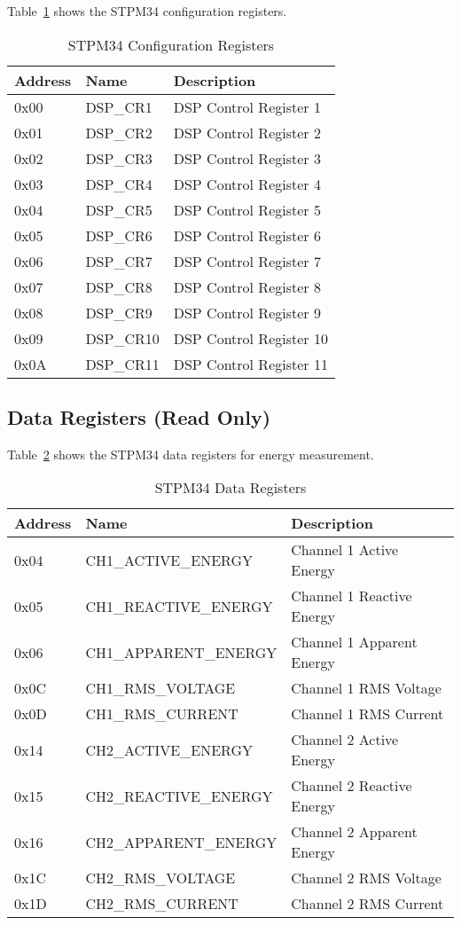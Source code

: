 \documentclass[11pt,a4paper]{article}
\begin{document}
Table~\ref{tab:config_regs} shows the STPM34 configuration registers.

\begin{table}[H]
\centering
\begin{tabular}{lll}
\toprule
\textbf{Address} & \textbf{Name} & \textbf{Description} \\
\midrule
0x00 & DSP\_CR1 & DSP Control Register 1 \\
0x01 & DSP\_CR2 & DSP Control Register 2 \\
0x02 & DSP\_CR3 & DSP Control Register 3 \\
0x03 & DSP\_CR4 & DSP Control Register 4 \\
0x04 & DSP\_CR5 & DSP Control Register 5 \\
0x05 & DSP\_CR6 & DSP Control Register 6 \\
0x06 & DSP\_CR7 & DSP Control Register 7 \\
0x07 & DSP\_CR8 & DSP Control Register 8 \\
0x08 & DSP\_CR9 & DSP Control Register 9 \\
0x09 & DSP\_CR10 & DSP Control Register 10 \\
0x0A & DSP\_CR11 & DSP Control Register 11 \\
\bottomrule
\end{tabular}
\caption{STPM34 Configuration Registers}
\label{tab:config_regs}
\end{table}

\subsection{Data Registers (Read Only)}

Table~\ref{tab:data_regs} shows the STPM34 data registers for energy measurement.

\begin{table}[H]
\centering
\small
\begin{tabular}{lll}
\toprule
\textbf{Address} & \textbf{Name} & \textbf{Description} \\
\midrule
0x04 & CH1\_ACTIVE\_ENERGY & Channel 1 Active Energy \\
0x05 & CH1\_REACTIVE\_ENERGY & Channel 1 Reactive Energy \\
0x06 & CH1\_APPARENT\_ENERGY & Channel 1 Apparent Energy \\
0x0C & CH1\_RMS\_VOLTAGE & Channel 1 RMS Voltage \\
0x0D & CH1\_RMS\_CURRENT & Channel 1 RMS Current \\
0x14 & CH2\_ACTIVE\_ENERGY & Channel 2 Active Energy \\
0x15 & CH2\_REACTIVE\_ENERGY & Channel 2 Reactive Energy \\
0x16 & CH2\_APPARENT\_ENERGY & Channel 2 Apparent Energy \\
0x1C & CH2\_RMS\_VOLTAGE & Channel 2 RMS Voltage \\
0x1D & CH2\_RMS\_CURRENT & Channel 2 RMS Current \\
\bottomrule
\end{tabular}
\caption{STPM34 Data Registers}
\label{tab:data_regs}
\end{table}
\end{document}
